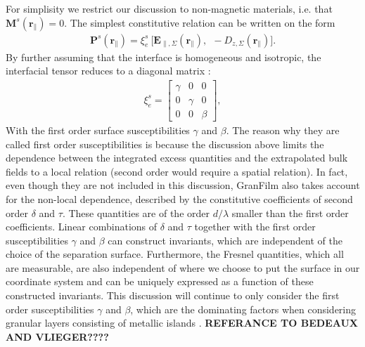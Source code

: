 For simplisity we restrict our discussion to non-magnetic materials,
i.e. that $\boldsymbol{M}^s(\boldsymbol{r}_{\parallel}) = 0$. The simplest constitutive relation
can be written on the form
\begin{align}
   \boldsymbol{P}^s(\boldsymbol{r}\!_{\parallel}) = \xi ^s_e \: \big[ \boldsymbol{E}_{\parallel, \Sigma}(\boldsymbol{r}\!_{\parallel}), \:\: - D\!_{z, \Sigma}(\boldsymbol{r}\!_{\parallel}) \big].
   \label{constitutiveRel}
\end{align}
By further assuming that the interface is homogeneous and isotropic, the interfacial tensor reduces
to a diagonal matrix \cite[p.~30]{BedeauxVliegerBook}:
\begin{align}
  \xi ^s_e = 
\begin{bmatrix}
   \gamma   &   0       &  0      \\
   0        &   \gamma  &  0      \\
   0        &   0       &  \beta 
\end{bmatrix}
,
\end{align}
With the first order surface susceptibilities $\gamma$ and $\beta$. The reason why they are called 
first order susceptibilities is because the discussion above limits the dependence between
the integrated excess quantities and the extrapolated bulk fields to a local relation (second order
would require a spatial relation).
In fact, even though they are not included in this discussion, 
GranFilm also takes account for the non-local dependence, described by the constitutive coefficients of
second order $\delta$ and $\tau$. These quantities are of the order
$d/\lambda$ smaller than the first order coefficients. 
Linear combinations of $\delta$ and $\tau$ together with the first order susceptibilities 
$\gamma$ and $\beta$ can construct invariants, which are independent of the choice of the separation surface. 
%
Furthermore, the Fresnel quantities, which all are measurable, are also independent of where we 
choose to put the surface in our coordinate system and can be uniquely expressed as a 
function of these constructed invariants.
This discussion will continue to only consider the first order susceptibilities $\gamma$ and $\beta$,
which are the dominating factors when considering granular layers consisting of metallic islands 
\cite{Lazzari2002}. \textbf{REFERANCE TO BEDEAUX AND VLIEGER????}



